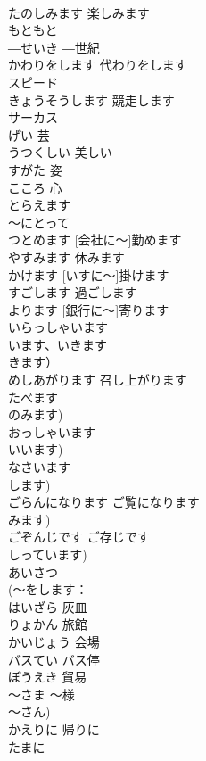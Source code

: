 \documentclass[8pt]{extreport}
\begin{document}
\begin{CJK}{UTF8}{min}
\\	たのしみます	楽しみます	
\\	もともと			
\\	―せいき	―世紀	
\\	かわりをします	代わりをします	
\\	スピード			
\\	きょうそうします	競走します	
\\	サーカス			
\\	げい	芸	
\\	うつくしい	美しい	
\\	すがた	姿	
\\	こころ	心	
\\	とらえます			
\\	～にとって			
\\	[かいしゃに～]つとめます	[会社に～]勤めます	
\\	やすみます	休みます	
\\	[いすに～]かけます	[いすに～]掛けます	
\\	すごします	過ごします	
\\	[ぎんこうに～]よります	[銀行に～]寄ります	
\\	いらっしゃいます			
\\	います、いきます 
\\	きます）		
\\	めしあがります	召し上がります	
\\	たべます 
\\	のみます)		
\\	おっしゃいます			
\\	いいます)		
\\	なさいます			
\\	します)		
\\	ごらんになります	ご覧になります	
\\	みます)		
\\	ごぞんじです	ご存じです	
\\	しっています)		
\\	あいさつ			
\\	(～をします：
\\	はいざら	灰皿	
\\	りょかん	旅館	
\\	かいじょう	会場	
\\	バスてい	バス停	
\\	ぼうえき	貿易	
\\	～さま	～様	
\\	～さん)		
\\	かえりに	帰りに	
\\	たまに			

\end{CJK}
\end{document}
